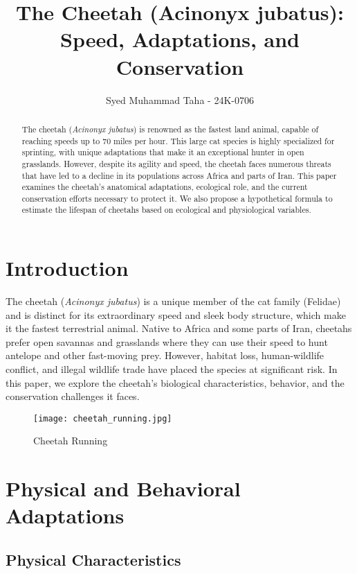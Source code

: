 \documentclass{article}
\title{The Cheetah (Acinonyx jubatus): Speed, Adaptations, and Conservation}
\author{Syed Muhammad Taha - 24K-0706}
\begin{document}
\maketitle

\begin{abstract}
The cheetah (\textit{Acinonyx jubatus}) is renowned as the fastest land animal, capable of reaching speeds up to 70 miles per hour. This large cat species is highly specialized for sprinting, with unique adaptations that make it an exceptional hunter in open grasslands. However, despite its agility and speed, the cheetah faces numerous threats that have led to a decline in its populations across Africa and parts of Iran. This paper examines the cheetah’s anatomical adaptations, ecological role, and the current conservation efforts necessary to protect it. We also propose a hypothetical formula to estimate the lifespan of cheetahs based on ecological and physiological variables.
\end{abstract}

\section{Introduction}

The cheetah (\textit{Acinonyx jubatus}) is a unique member of the cat family (Felidae) and is distinct for its extraordinary speed and sleek body structure, which make it the fastest terrestrial animal. Native to Africa and some parts of Iran, cheetahs prefer open savannas and grasslands where they can use their speed to hunt antelope and other fast-moving prey. However, habitat loss, human-wildlife conflict, and illegal wildlife trade have placed the species at significant risk. In this paper, we explore the cheetah’s biological characteristics, behavior, and the conservation challenges it faces.

\begin{figure}[H]
    \centering
    \texttt{[image: cheetah\_running.jpg]}
    \caption{Cheetah Running}
\end{figure}

\section{Physical and Behavioral Adaptations}

\subsection{Physical Characteristics}
\end{document}
